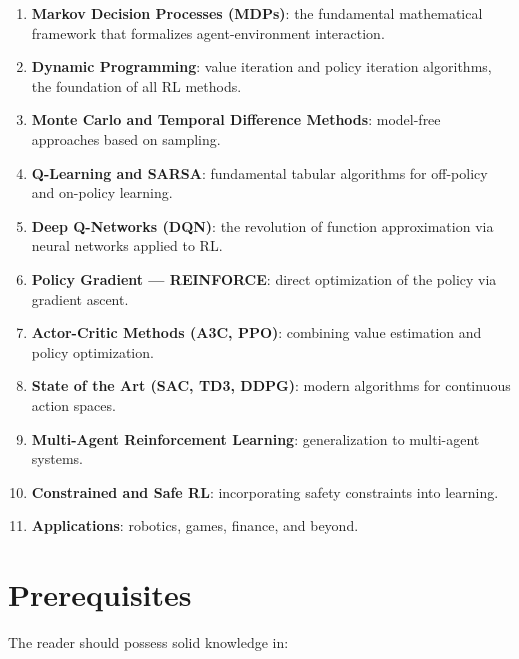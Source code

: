 \begin{enumerate}
    \item \textbf{Markov Decision Processes (MDPs)}: the fundamental mathematical
    framework that formalizes agent-environment interaction.

    \item \textbf{Dynamic Programming}: value iteration and policy iteration
    algorithms, the foundation of all RL methods.

    \item \textbf{Monte Carlo and Temporal Difference Methods}: model-free
    approaches based on sampling.

    \item \textbf{Q-Learning and SARSA}: fundamental tabular algorithms for
    off-policy and on-policy learning.

    \item \textbf{Deep Q-Networks (DQN)}: the revolution of function approximation
    via neural networks applied to RL.

    \item \textbf{Policy Gradient --- REINFORCE}: direct optimization of the
    policy via gradient ascent.

    \item \textbf{Actor-Critic Methods (A3C, PPO)}: combining value estimation
    and policy optimization.

    \item \textbf{State of the Art (SAC, TD3, DDPG)}: modern algorithms for
    continuous action spaces.

    \item \textbf{Multi-Agent Reinforcement Learning}: generalization to
    multi-agent systems.

    \item \textbf{Constrained and Safe RL}: incorporating safety constraints
    into learning.

    \item \textbf{Applications}: robotics, games, finance, and beyond.
\end{enumerate}

\section*{Prerequisites}

The reader should possess solid knowledge in:

